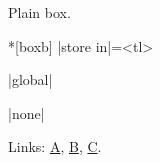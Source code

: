 \documentclass{article}
\begin{document}
\begin{tcolorbox}[hypertarget=boxa]Plain box.\end{tcolorbox}
\begin{macrodef}*[boxb]
|store in|={<tl>}
\end{macrodef}
\begin{macrodef}[boxc]
|global|
\end{macrodef}
\begin{macrodef}
|none|
\end{macrodef}
Links: \hyperlink{boxa}{A}, \hyperlink{boxb}{B}, \hyperlink{boxc}{C}.
\end{document}
